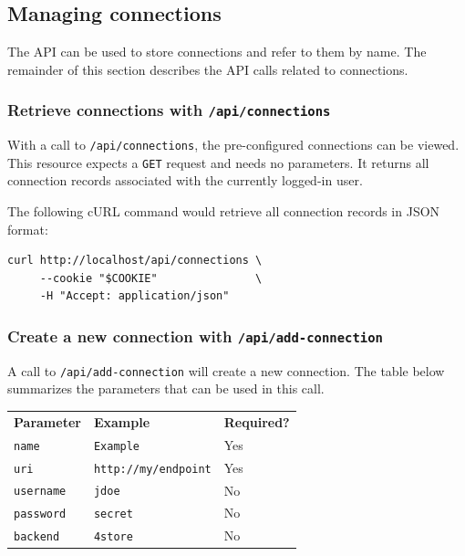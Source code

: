 \subsection{Managing connections}

  The API can be used to store connections and refer to them by name.  The
  remainder of this section describes the API calls related to connections.

\subsubsection{Retrieve connections with \texttt{/api/connections}}

  With a call to \texttt{/api/connections}, the pre-configured connections
  can be viewed.  This resource expects a \texttt{GET} request and needs no
  parameters.  It returns all connection records associated with the currently
  logged-in user.

  The following cURL command would retrieve all connection records in JSON
  format:

\begin{siderules}
\begin{verbatim}
curl http://localhost/api/connections \
     --cookie "$COOKIE"               \
     -H "Accept: application/json"
\end{verbatim}
\end{siderules}

\subsubsection{Create a new connection with \texttt{/api/add-connection}}
\label{sec:api-create-connection}

  A call to \texttt{/api/add-connection} will create a new connection.
  The table below summarizes the parameters that can be used in this call.

  \hypersetup{urlcolor=black}
  \begin{table}[H]
    \begin{tabularx}{\textwidth}{l!{\VRule[-1pt]}X!{\VRule[-1pt]}X}
      \headrow
      \textbf{Parameter} & \textbf{Example} & \textbf{Required?}\\
      \evenrow
      \texttt{name}      & \texttt{Example}            & Yes\\
      \oddrow
      \texttt{uri}       & \texttt{http://my/endpoint} & Yes\\
      \evenrow
      \texttt{username}  & \texttt{jdoe}               & No\\
      \oddrow
      \texttt{password}  & \texttt{secret}             & No\\
      \evenrow
      \texttt{backend}   & \texttt{4store}             & No\\
    \end{tabularx}
  \end{table}
  \hypersetup{urlcolor=LinkGray}

